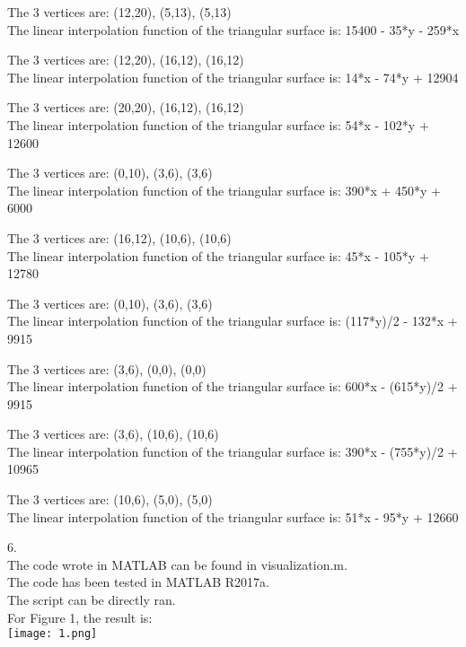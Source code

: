 \documentclass[a4paper]{article}
\begin{document}
The 3 vertices are: (12,20), (5,13), (5,13)\\
The linear interpolation function of the triangular surface is: 15400 - 35*y - 259*x

The 3 vertices are: (12,20), (16,12), (16,12)\\
The linear interpolation function of the triangular surface is: 14*x - 74*y + 12904

The 3 vertices are: (20,20), (16,12), (16,12)\\
The linear interpolation function of the triangular surface is: 54*x - 102*y + 12600

The 3 vertices are: (0,10), (3,6), (3,6)\\
The linear interpolation function of the triangular surface is: 390*x + 450*y + 6000

The 3 vertices are: (16,12), (10,6), (10,6)\\
The linear interpolation function of the triangular surface is: 45*x - 105*y + 12780

The 3 vertices are: (0,10), (3,6), (3,6)\\
The linear interpolation function of the triangular surface is: (117*y)/2 - 132*x + 9915

The 3 vertices are: (3,6), (0,0), (0,0)\\
The linear interpolation function of the triangular surface is: 600*x - (615*y)/2 + 9915

The 3 vertices are: (3,6), (10,6), (10,6)\\
The linear interpolation function of the triangular surface is: 390*x - (755*y)/2 + 10965

The 3 vertices are: (10,6), (5,0), (5,0)\\
The linear interpolation function of the triangular surface is: 51*x - 95*y + 12660

6.\\
The code wrote in MATLAB can be found in visualization.m.\\
The code has been tested in MATLAB R2017a.\\
The script can be directly ran.\\
For Figure 1, the result is: \\
\texttt{[image: 1.png]}
\end{document}
